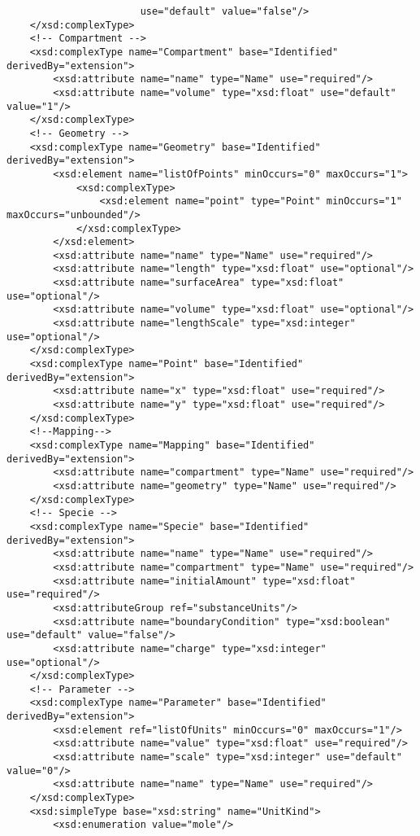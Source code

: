\documentclass[10pt]{cek-article}
\begin{document}
\begin{small}
\begin{verbatim}
                       use="default" value="false"/>
    </xsd:complexType>
    <!-- Compartment -->
    <xsd:complexType name="Compartment" base="Identified" derivedBy="extension">
        <xsd:attribute name="name" type="Name" use="required"/>
        <xsd:attribute name="volume" type="xsd:float" use="default" value="1"/>
    </xsd:complexType>
    <!-- Geometry -->
    <xsd:complexType name="Geometry" base="Identified" derivedBy="extension">
        <xsd:element name="listOfPoints" minOccurs="0" maxOccurs="1">
            <xsd:complexType>
                <xsd:element name="point" type="Point" minOccurs="1" maxOccurs="unbounded"/>
            </xsd:complexType>
        </xsd:element>
        <xsd:attribute name="name" type="Name" use="required"/>
        <xsd:attribute name="length" type="xsd:float" use="optional"/>
        <xsd:attribute name="surfaceArea" type="xsd:float" use="optional"/>
        <xsd:attribute name="volume" type="xsd:float" use="optional"/>
        <xsd:attribute name="lengthScale" type="xsd:integer" use="optional"/>
    </xsd:complexType>
    <xsd:complexType name="Point" base="Identified" derivedBy="extension">
        <xsd:attribute name="x" type="xsd:float" use="required"/>
        <xsd:attribute name="y" type="xsd:float" use="required"/>
    </xsd:complexType>
    <!--Mapping-->
    <xsd:complexType name="Mapping" base="Identified" derivedBy="extension">
        <xsd:attribute name="compartment" type="Name" use="required"/>
        <xsd:attribute name="geometry" type="Name" use="required"/>
    </xsd:complexType>
    <!-- Specie -->
    <xsd:complexType name="Specie" base="Identified" derivedBy="extension">
        <xsd:attribute name="name" type="Name" use="required"/>
        <xsd:attribute name="compartment" type="Name" use="required"/>
        <xsd:attribute name="initialAmount" type="xsd:float" use="required"/>
        <xsd:attributeGroup ref="substanceUnits"/>
        <xsd:attribute name="boundaryCondition" type="xsd:boolean" use="default" value="false"/>
        <xsd:attribute name="charge" type="xsd:integer" use="optional"/>
    </xsd:complexType>
    <!-- Parameter -->
    <xsd:complexType name="Parameter" base="Identified" derivedBy="extension">
        <xsd:element ref="listOfUnits" minOccurs="0" maxOccurs="1"/>
        <xsd:attribute name="value" type="xsd:float" use="required"/>
        <xsd:attribute name="scale" type="xsd:integer" use="default" value="0"/>
        <xsd:attribute name="name" type="Name" use="required"/>
    </xsd:complexType>
    <xsd:simpleType base="xsd:string" name="UnitKind">
        <xsd:enumeration value="mole"/>

\end{verbatim}
\end{small}
\end{document}
